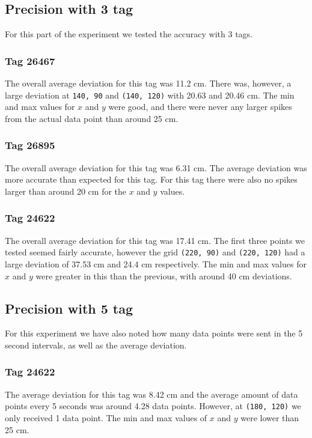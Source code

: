 \subsection{Precision with 3 tag}
For this part of the experiment we tested the accuracy with 3 tags. 

\subsubsection{Tag 26467}
The overall average deviation for this tag was 11.2 cm.
There was, however, a large deviation at \texttt{140, 90} and \texttt{(140, 120)} with 20.63 and 20.46 cm.
The min and max values for $x$ and $y$ were good, and there were never any larger spikes from the actual data point than around 25 cm.

\subsubsection{Tag 26895}
The overall average deviation for this tag was 6.31 cm.
The average deviation was more accurate than expected for this tag.
For this tag there were also no spikes larger than around 20 cm for the $x$ and $y$ values.

\subsubsection{Tag 24622}
The overall average deviation for this tag was 17.41 cm.
The first three points we tested seemed fairly accurate, however the grid \texttt{(220, 90)} and \texttt{(220, 120)} had a large deviation of 37.53 cm and 24.4 cm respectively.
The min and max values for $x$ and $y$ were greater in this than the previous, with around 40 cm deviations.

\subsection{Precision with 5 tag}
For this experiment we have also noted how many data points were sent in the 5 second intervals, as well as the average deviation.

\subsubsection{Tag 24622}
The average deviation for this tag was 8.42 cm and the average amount of data points every 5 seconds was around 4.28 data points.
However, at \texttt{(180, 120)} we only received 1 data point.
The min and max values of $x$ and $y$ were lower than 25 cm.

